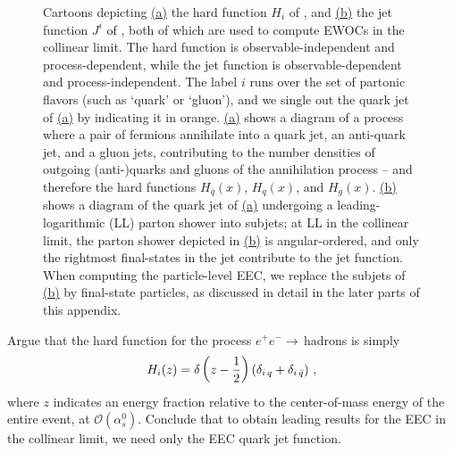 \begin{figure}[t!]
    \centering
    \caption[Cartoons depicting hard functions and jet functions for EWOCs]{
        Cartoons depicting \hyperref[fig:hardfunction:cartoon]{(a)} the hard function \(H_i\) of , and \hyperref[fig:jetfunction:cartoon]{(b)} the jet function \(J^i\) of , both of which are used to compute EWOCs in the collinear limit.
        The hard function is observable-independent and process-dependent, while the jet function is observable-dependent and process-independent.
        The label \(i\) runs over the set of partonic flavors (such as `quark' or `gluon'), and we single out the quark jet of \hyperref[fig:hardfunction:cartoon]{(a)} by indicating it in orange.
        \hyperref[fig:hardfunction:cartoon]{(a)} shows a diagram of a process where a pair of fermions annihilate into a quark jet, an anti-quark jet, and a gluon jets, contributing to the number densities of outgoing (anti-)quarks and gluons of the annihilation process -- and therefore the hard functions \(H_{\overline{q}}(x)\), \(H_q(x)\), and \(H_g(x)\).
        \hyperref[fig:jetfunction:cartoon]{(b)} shows a diagram of the quark jet of \hyperref[fig:hardfunction:cartoon]{(a)} undergoing a leading-logarithmic (LL) parton shower into subjets;
        at LL in the collinear limit, the parton shower depicted in \hyperref[fig:jetfunction:cartoon]{(b)} is angular-ordered, and only the rightmost final-states in the jet contribute to the jet function.
        When computing the particle-level EEC, we replace the subjets of \hyperref[fig:jetfunction:cartoon]{(b)} by final-state particles, as discussed in detail in the later parts of this appendix.
    }
    \label{fig:EWOCs:cartoon:factorization}
\end{figure}


\begin{exercise}
    Argue that the hard function for the process \(e^+ e^- \to\,\)hadrons is simply
    \begin{align}
        H_i(z)
        =
        \delta\left(z - \frac{1}{2}\right)
        \left(\delta_{i\,q} + \delta_{i\,\bar{q}}\right)
        \,,
    \end{align}
    where \(z\) indicates an energy fraction relative to the center-of-mass energy of the entire event, at \(\mathcal{O}(\alpha_s^0)\).
    Conclude that to obtain leading results for the EEC in the collinear limit, we need only the EEC quark jet function.
\end{exercise}



